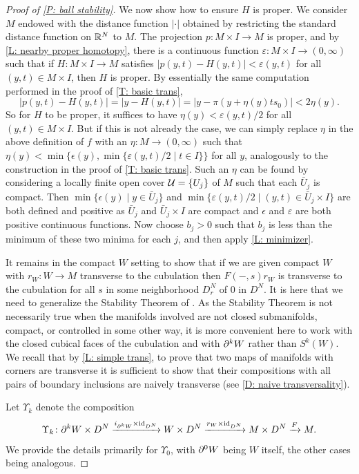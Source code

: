 \begin{proof}[Proof of \cref{P: ball stability}]
	We now show how to ensure $H$ is proper.
	We consider $M$ endowed with the distance function $|\cdot|$ obtained by restricting the standard distance function on $\mathbb{R}^N$ to $M$.
	The projection $p \colon M \times I \to M$ is proper, and by
	\cref{L: nearby proper homotopy}, there is a continuous function $\varepsilon \colon M \times I \to (0,\infty)$ such that if $H \colon M \times I \to M$ satisfies $|p(y,t)-H(y,t)| < \varepsilon(y,t)$ for all $(y,t) \in M \times I$, then $H$ is proper.
	By essentially the same computation performed in the proof of \cref{T: basic trans},
	$$|p(y,t)-H(y,t)| = |y-H(y,t)| = |y - \pi(y + \eta(y) ts_0)| < 2 \eta(y).$$
	So for $H$ to be proper, it suffices to have $\eta(y) < \varepsilon(y,t)/2$ for all $(y,t) \in M \times I$.
	But if this is not already the case, we can simply replace $\eta$ in the above definition of $f$ with an $\eta \colon M \to (0,\infty)$ such that $\eta(y) < \min\{\epsilon(y), \min\{\varepsilon(y,t)/2 \mid t \in I\}\}$ for all $y$, analogously to the construction in the proof of \cref{T: basic trans}.
	Such an $\eta$ can be found by considering a locally finite open cover $\mathcal{U} = \{U_j\}$ of $M$ such that each $\bar U_j$ is compact.
	Then $\min\{\epsilon(y) \mid y \in \bar U_j\}$ and $\min\{\varepsilon(y,t)/2 \mid (y,t) \in \bar U_j \times I\}$ are both defined and positive as $\bar U_j$ and $\bar U_j \times I$ are compact and $\epsilon$ and $\varepsilon$ are both positive continuous functions.
	Now choose $b_j > 0$ such that $b_j$ is less than the minimum of these two minima for each $j$, and then apply \cref{L: minimizer}.

	It remains in the compact $W$ setting to show that if we are given compact $W$ with $r_W \colon W \to M$ transverse to the cubulation then $F(-,s)r_W$ is transverse to the cubulation for all $s$ in some neighborhood $D_r^N$ of $0$ in $D^N$.
	It is here that we need to generalize the Stability Theorem of \cite[Section 1.6]{GuPo74}.
	As the Stability Theorem is not necessarily true when the manifolds involved are not closed submanifolds, compact, or controlled in some other way, it is more convenient here to work with the closed cubical faces of the cubulation and with $\partial^kW$ rather than $S^k(W)$.
	We recall that by \cref{L: simple trans}, to prove that two maps of manifolds with corners are transverse it is sufficient to show that their compositions with all pairs of boundary inclusions are naively transverse (see \cref{D: naive transversality}).

	Let $\Upsilon_k$ denote the composition $$\Upsilon_k \colon \partial^kW \times D^N \xrightarrow{i_{\partial^ kW} \times \mathrm{id}_{D^N}} W \times D^N \xrightarrow{r_W \times \mathrm{id}_{D^N} } M \times D^N \xrightarrow{F} M.$$
	We provide the details primarily for $\Upsilon_0$, with $\partial^0 W$ being $W$ itself, the other cases being analogous.



\end{proof}
